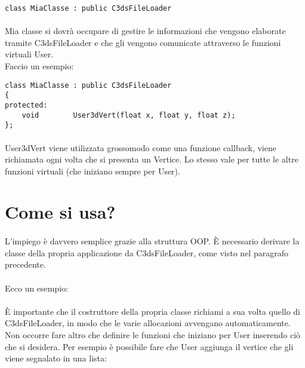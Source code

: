 \documentclass[11pt,a4paper]{article}
\begin{document}
\begin{verbatim}
class MiaClasse : public C3dsFileLoader
\end{verbatim}

\paragraph*{}
Mia classe si dovr\`a occupare di gestire le informazioni che vengono elaborate tramite C3dsFileLoader e che gli vengono comunicate attraverso le funzioni virtuali User.\\
Faccio un esempio:

\begin{verbatim}
class MiaClasse : public C3dsFileLoader
{
protected:
	void		User3dVert(float x, float y, float z);
};
\end{verbatim}

\paragraph*{}
User3dVert viene utilizzata grossomodo come una funzione callback, viene richiamata ogni volta che si presenta un Vertice. Lo stesso vale per tutte le altre funzioni virtuali (che iniziano sempre per User).

\section*{Come si usa?}
\paragraph*{}
L'impiego \`e davvero semplice grazie alla struttura OOP. \`E necessario derivare la classe della propria applicazione da C3dsFileLoader, come visto nel paragrafo precedente.
\\
\\
Ecco un esempio:


\paragraph*{}
\`E importante che il costruttore della propria classe richiami a sua volta quello di C3dsFileLoader, in modo che le varie allocazioni avvengano automaticamente.
Non occorre fare altro che definire le funzioni che iniziano per User inserendo ci\`o che si desidera. Per esempio \`e possibile fare che User aggiunga il vertice che gli viene segnalato in una lista:
\end{document}
